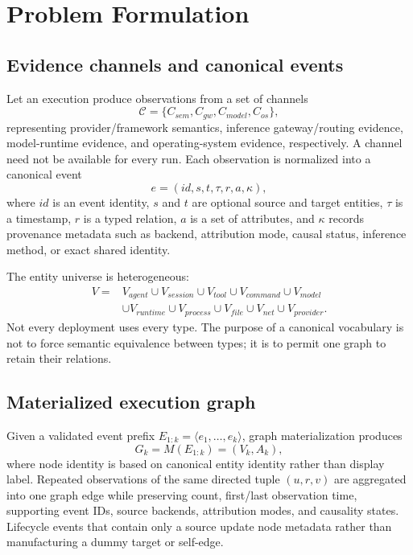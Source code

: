 \section{Problem Formulation}
\subsection{Evidence channels and canonical events}
Let an execution produce observations from a set of channels
\begin{equation}
\mathcal{C}=\{C_{sem},C_{gw},C_{model},C_{os}\},
\end{equation}
representing provider/framework semantics, inference gateway/routing evidence, model-runtime evidence, and operating-system evidence, respectively. A channel need not be available for every run. Each observation is normalized into a canonical event
\begin{equation}
e=(id,s,t,\tau,r,a,\kappa),
\end{equation}
where $id$ is an event identity, $s$ and $t$ are optional source and target entities, $\tau$ is a timestamp, $r$ is a typed relation, $a$ is a set of attributes, and $\kappa$ records provenance metadata such as backend, attribution mode, causal status, inference method, or exact shared identity.

The entity universe is heterogeneous:
\begin{align}
V = {} & V_{agent}\cup V_{session}\cup V_{tool}\cup V_{command}\cup V_{model} \nonumber\\
      & \cup V_{runtime}\cup V_{process}\cup V_{file}\cup V_{net}\cup V_{provider}.
\end{align}
Not every deployment uses every type. The purpose of a canonical vocabulary is not to force semantic equivalence between types; it is to permit one graph to retain their relations.

\subsection{Materialized execution graph}
Given a validated event prefix $E_{1:k}=\langle e_1,\ldots,e_k\rangle$, graph materialization produces
\begin{equation}
G_k=M(E_{1:k})=(V_k,A_k),
\end{equation}
where node identity is based on canonical entity identity rather than display label. Repeated observations of the same directed tuple $(u,r,v)$ are aggregated into one graph edge while preserving count, first/last observation time, supporting event IDs, source backends, attribution modes, and causality states. Lifecycle events that contain only a source update node metadata rather than manufacturing a dummy target or self-edge.

